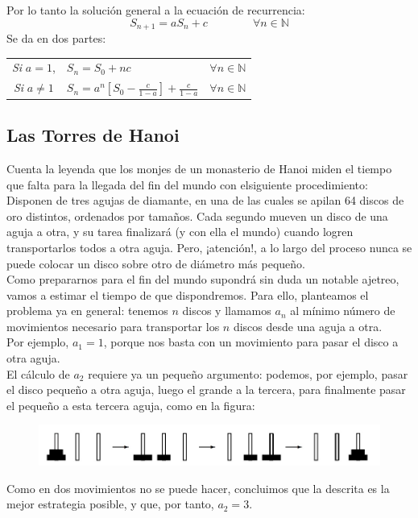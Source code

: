 \documentclass{article}
\begin{document}
Por lo tanto la solución general a la ecuación de recurrencia:
$$S_{n+1} = aS_n + c \qquad \qquad \forall n \in \mathbb{N}$$
Se da en dos partes:\\
\begin{tabular}{cll}
    \textit{Si} $a=1$, & $S_n = S_0 + nc$ & $\forall n \in \mathbb{N}$\\
     \textit{Si} $a\neq 1$& $S_n = a^n [S_0 - \frac{c}{1-a}] + \frac{c}{1-a}$  &$\forall n \in \mathbb{N} $
\end{tabular}

\subsection{Las Torres de Hanoi}

Cuenta la leyenda que los monjes de un monasterio de Hanoi miden el tiempo que falta para la llegada del fin del mundo con elsiguiente procedimiento: Disponen de tres agujas de diamante, en una de las cuales se apilan 64 discos de oro distintos, ordenados por tamaños. Cada segundo mueven un disco de una aguja a otra, y su tarea finalizará (y con ella el mundo) cuando logren transportarlos todos a otra aguja. Pero, ¡atención!, a lo largo del proceso nunca se puede colocar un disco sobre otro de diámetro más pequeño.\\

Como prepararnos para el fin del mundo supondrá sin duda un notable ajetreo, vamos a estimar el tiempo de que dispondremos. Para ello, planteamos el problema ya en general: tenemos $n$ discos y llamamos $a_n$ al mínimo número de movimientos necesario para transportar los $n$ discos desde una aguja a otra.\\
Por ejemplo, $a_1 = 1$, porque nos basta con un movimiento para pasar el disco a otra aguja.\\
El cálculo de $a_2$ requiere ya un pequeño argumento: podemos, por ejemplo, pasar el disco pequeño a otra aguja, luego el grande a la tercera, para finalmente pasar el pequeño a esta tercera aguja, como en la figura:

\begin{figure}[h]
    \centering
    \includegraphics[scale=0.5]{real.jpg}
\end{figure}

Como en dos movimientos no se puede hacer, concluimos que la descrita es la mejor estrategia posible, y que, por tanto, $a_2 = 3$.\\
\end{document}

